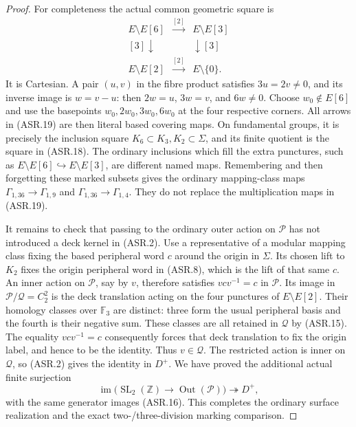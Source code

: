 \begin{proof}
For completeness the actual common geometric square is
\[
\begin{array}{ccc}
 E\setminus E[6]&\xrightarrow{[2]}&E\setminus E[3]\\
 {\scriptstyle[3]}\downarrow&&\downarrow{\scriptstyle[3]}\\
 E\setminus E[2]&\xrightarrow{[2]}&E\setminus\{0\}.
\end{array}                                             \tag{ASR.19}
\]
It is Cartesian.  A pair $(u,v)$ in the fibre product
satisfies $3u=2v\ne0$, and its inverse image is
$w=v-u$: then $2w=u$, $3w=v$, and $6w\ne0$.
Choose $w_0\notin E[6]$ and use the basepoints
$w_0,2w_0,3w_0,6w_0$ at the four respective corners.
All arrows in (ASR.19) are then literal based covering
maps.  On fundamental groups, it is precisely the
inclusion square $K_6\subset K_3,K_2\subset\Sigma$,
and its finite quotient is the square in (ASR.18).
The ordinary inclusions which fill the extra punctures,
such as $E\setminus E[6]\hookrightarrow E\setminus E[3]$,
are different named maps.  Remembering and then forgetting
these marked subsets gives the ordinary mapping-class
maps $\Gamma_{1,36}\to\Gamma_{1,9}$ and
$\Gamma_{1,36}\to\Gamma_{1,4}$.  They do not replace
the multiplication maps in (ASR.19).

It remains to check that passing to the ordinary outer
action on $\mathcal P$ has not introduced a deck kernel
in (ASR.2).  Use a representative of a modular mapping
class fixing the based peripheral word $c$ around the
origin in $\Sigma$.  Its chosen lift to $K_2$ fixes the
origin peripheral word in (ASR.8), which is the lift
of that same $c$.
An inner action on $\mathcal P$, say by $v$, therefore
satisfies $vcv^{-1}=c$ in $\mathcal P$.
Its image in $\mathcal P/\mathcal Q=C_2^2$ is the
deck translation acting on the four punctures of
$E\setminus E[2]$.
Their homology classes over $\mathbb F_3$ are distinct:
three form the usual peripheral basis and the fourth
is their negative sum.  These classes are all retained
in $\mathcal Q$ by (ASR.15).
The equality $vcv^{-1}=c$ consequently forces that
deck translation to fix the origin label, and hence
to be the identity.  Thus $v\in\mathcal Q$.
The restricted action is inner on $\mathcal Q$, so
(ASR.2) gives the identity in $D^+$.
We have proved the additional actual finite surjection
\[
 \operatorname{im}\bigl(
 \operatorname{SL}_2(\mathbb Z)\to
                  \operatorname{Out}(\mathcal P)\bigr)
       \twoheadrightarrow D^+,                        \tag{ASR.20}
\]
with the same generator images (ASR.16).
This completes the ordinary surface realization and
the exact two-/three-division marking comparison.
\end{proof}

